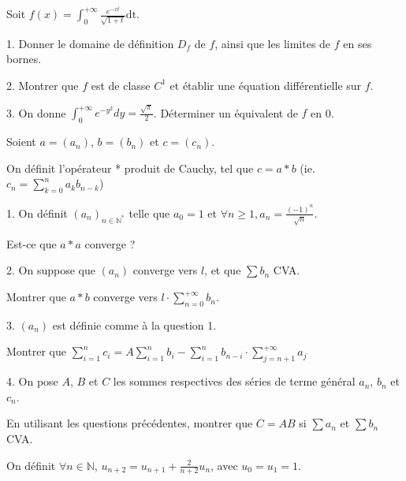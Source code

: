\noindent Soit $\displaystyle f(x) = \int_{0}^{+\infty} \frac {e^{-xt}} {\sqrt{1+t}}\mathrm{dt}$.

\vspace{5pt}
1. Donner le domaine de définition $D_f$ de $f$, ainsi que les limites de $f$ en ses bornes.

\vspace{5pt}
2. Montrer que $f$ est de classe $C^1$ et établir une équation différentielle sur $f$.

\vspace{5pt}
3. On donne $\displaystyle \int_{0}^{+\infty} {e^{-y^2}dy} = \frac {\sqrt{\pi}} {2}$.
Déterminer un équivalent de $f$ en 0.



\subetoiles



\noindent Soient $a = (a_n)$, $b = (b_n)$ et $c = (c_n)$.

\noindent On définit l'opérateur * produit de Cauchy, tel que $c = a * b$
(ie. $\displaystyle c_n = \sum_{k = 0}^{n} {a_kb_{n-k}}$)

\vspace{5pt}
1. On définit $(a_n)_{n \in \mathbb{N}^*}$ telle que $a_0 = 1$ et $\displaystyle \forall n \geqslant 1, a_n = \frac {(-1)^n} {\sqrt{n}}$.

Est-ce que $a * a$ converge ?

\vspace{10pt}
2. On suppose que $(a_n)$ converge vers $l$, et que $\sum b_n$ CVA.

Montrer que $a*b$ converge vers $\displaystyle l \cdot \sum_{n=0}^{+\infty}{b_n}$.

\vspace{10pt}
3. $(a_n)$ est définie comme à la question 1.

Montrer que $\displaystyle \sum_{i = 1}^{n} c_i = A \sum_{i = 1}^{n} b_i - \sum_{i = 1}^{n} b_{n-i} \cdot \sum_{j = n+1}^{+\infty} a_j$


\vspace{10pt}
4. On pose $A$, $B$ et $C$ les sommes respectives des séries de terme général $a_n$, $b_n$ et $c_n$.

En utilisant les questions précédentes, montrer que $C = AB$ si $\sum a_n$ et $\sum b_n$ CVA.



\subetoiles
\columnbreak



\noindent On définit $\forall n \in \mathbb{N}$, $\displaystyle u_{n+2} = u_{n+1} + \frac {2} {n+2} u_n$,
avec $u_0 = u_1 = 1$.

